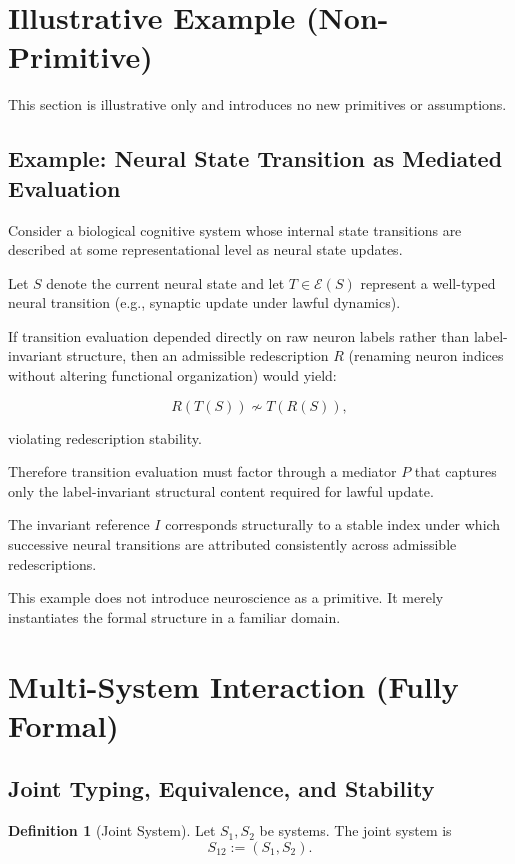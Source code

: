 \documentclass[11pt]{article}
\theoremstyle{definition}
\newtheorem{definition}{Definition}
\begin{document}
\section{Illustrative Example (Non-Primitive)}

This section is illustrative only and introduces no new primitives or assumptions.

\subsection{Example: Neural State Transition as Mediated Evaluation}

Consider a biological cognitive system whose internal state transitions are described
at some representational level as neural state updates.

Let $S$ denote the current neural state and let $T \in \mathcal{E}(S)$
represent a well-typed neural transition (e.g., synaptic update under lawful dynamics).

If transition evaluation depended directly on raw neuron labels
rather than label-invariant structure,
then an admissible redescription $R$ (renaming neuron indices
without altering functional organization)
would yield:

\[
R(T(S)) \not\sim T(R(S)),
\]

violating redescription stability.

Therefore transition evaluation must factor through
a mediator $P$ that captures only the label-invariant structural content
required for lawful update.

The invariant reference $I$ corresponds structurally to a stable index
under which successive neural transitions are attributed consistently
across admissible redescriptions.

This example does not introduce neuroscience as a primitive.
It merely instantiates the formal structure in a familiar domain.


\section{Multi-System Interaction (Fully Formal)}

\subsection{Joint Typing, Equivalence, and Stability}

\begin{definition}[Joint System]
Let $S_1,S_2$ be systems. The joint system is
\[
S_{12}:=(S_1,S_2).
\]
\end{definition}
\end{document}
